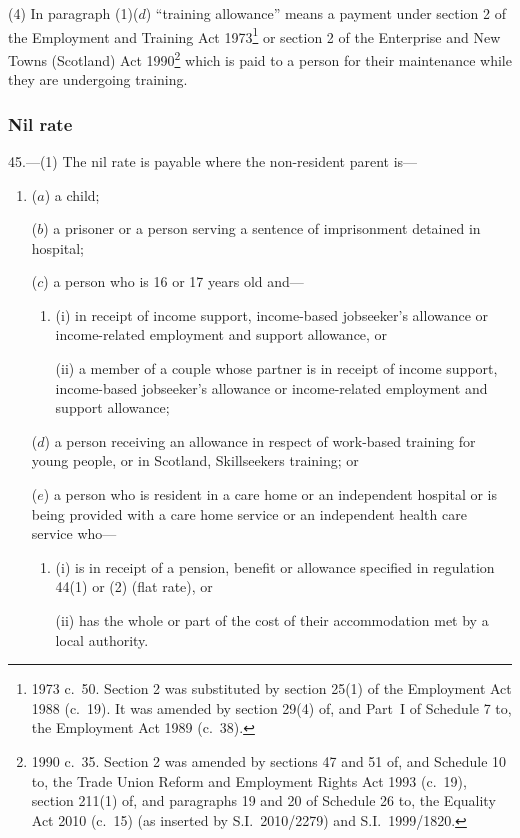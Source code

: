 \documentclass[12pt,a4paper]{article}
\begin{document}
(4) In paragraph (1)($d$)  “training allowance” means a payment under section 2 of the Employment and Training Act 1973\footnote{1973 c.~50. Section 2 was substituted by section 25(1) of the Employment Act 1988 (c.~19). It was amended by section 29(4) of, and Part~I of Schedule 7 to, the Employment Act 1989 (c.~38).} or section 2 of the Enterprise and New Towns (Scotland) Act 1990\footnote{1990 c.~35. Section 2 was amended by sections 47 and 51 of, and Schedule 10 to, the Trade Union Reform and Employment Rights Act 1993 (c.~19), section 211(1) of, and paragraphs 19 and 20 of Schedule 26 to, the Equality Act 2010 (c.~15) (as inserted by S.I.~2010/2279) and S.I.~1999/1820.} which is paid to a person for their maintenance while they are undergoing training.

\subsubsection[45. Nil rate]{Nil rate}

45.---(1)  The nil rate is payable where the non-resident parent is—
\begin{enumerate}\item[]
($a$) a child;

($b$) a prisoner or a person serving a sentence of imprisonment detained in hospital;

($c$) a person who is 16 or 17 years old and—
\begin{enumerate}\item[]
(i) in receipt of income support, income-based jobseeker’s allowance or income-related employment and support allowance, or

(ii) a member of a couple whose partner is in receipt of income support, income-based jobseeker’s allowance or income-related employment and support allowance;
\end{enumerate}

($d$) a person receiving an allowance in respect of work-based training for young people, or in Scotland, Skillseekers training; or

($e$) a person who is resident in a care home or an independent hospital or is being provided with a care home service or an independent health care service who—
\begin{enumerate}\item[]
(i) is in receipt of a pension, benefit or allowance specified in regulation 44(1) or (2) (flat rate), or

(ii) has the whole or part of the cost of their accommodation met by a local authority.
\end{enumerate}
\end{enumerate}
\end{document}
